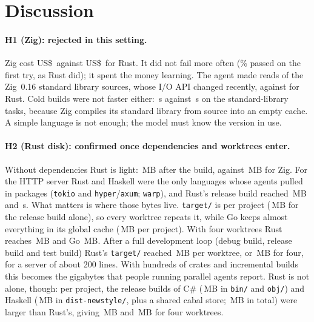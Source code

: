\documentclass[11pt,a4paper]{article}
\begin{document}
\section{Discussion}

\paragraph{H1 (Zig): rejected in this setting.} Zig cost US\$\,\CostZig{} against US\$\,\CostRust{} for
Rust. It did not fail more often (\FirstZig\% passed on the first try, as Rust did); it spent the money
learning. The agent made \StdZig{} reads of the Zig~0.16 standard library sources, whose I/O API
changed recently, against \StdRust{} for Rust. Cold builds were not faster either: \StdBuildZig\,s
against \StdBuildRust\,s on the standard-library tasks, because Zig compiles its standard library from
source into an empty cache. A simple language is not enough; the model must know the version in use.

\paragraph{H2 (Rust disk): confirmed once dependencies and worktrees enter.} Without dependencies Rust is
light: \StdDiskRust\,MB after the build, against \StdDiskZig\,MB for Zig. For the HTTP server Rust and
Haskell were the only languages whose agents pulled in packages (\texttt{tokio} and
\texttt{hyper}/\texttt{axum}; \texttt{warp}), and Rust's release build reached \KvDiskRust\,MB and \KvBuildRust\,s. What matters is where those bytes live.
\texttt{target/} is per project (\KvProjRust\,MB for the release build alone), so every worktree
repeats it, while Go keeps almost everything in its global cache (\KvProjGo\,MB per project). With four
worktrees Rust reaches \KvWtRust\,MB and Go \KvWtGo\,MB. After a full development loop (debug build,
release build and test build) Rust's \texttt{target/} reached \DevloopRust\,MB per worktree, or
\DevloopRustWt\,MB for four, for a server of about 200 lines. With hundreds of crates and incremental
builds this becomes the gigabytes that people running parallel agents report. Rust is not alone, though:
per project, the release builds of C\# (\KvProjCsharp\,MB in \texttt{bin/} and \texttt{obj/}) and
Haskell (\KvProjHaskell\,MB in \texttt{dist-newstyle/}, plus a shared cabal store; \KvDiskHaskell\,MB
in total) were larger than Rust's, giving \KvWtCsharp\,MB and \KvWtHaskell\,MB for four worktrees.
\end{document}
